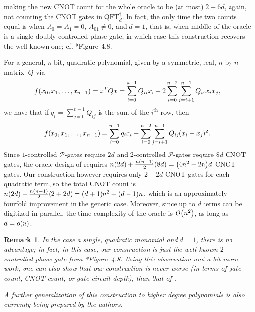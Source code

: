 \documentclass[reqno,10pt]{amsart}
\numberwithin{equation}{section}                %
\let\originalleft\left
\let\originalright\right
\renewcommand{\left}{\mathopen{}\mathclose\bgroup\originalleft}
\renewcommand{\right}{\aftergroup\egroup\originalright}
\def\({\mathopen{}\left(}
\def\){\right)\mathclose{}}
\newtheorem{remark}[theorem]{Remark}
\def\cP{\mathcal{P}}
\def\QFT{\mathrm{QFT}}
\begin{document}
making the new CNOT count for the whole oracle to be (at most) $2 + 6d$, again, not counting the CNOT gates in $\QFT_d^\dagger$. In fact, the only time the two counts equal is when $A_0 = A_1 = 0$, $A_{01} \neq 0$, and $d = 1$, that is, when middle of the oracle is a single doubly-controlled phase gate, in which case this construction recovers the well-known one; cf. \cite{nielsen_quantum_2010}*{Figure~4.8}.

\smallskip

For a general, $n$-bit, quadratic polynomial, given by a symmetric, real, $n$-by-$n$ matrix, $Q$ via
\begin{equation}
   f \( x_0, x_1, \ldots, x_{n - 1} \) = x^T Q x = \sum\limits_{i = 0}^{n - 1} Q_{ii} x_i + 2 \sum\limits_{i = 0}^{n - 2} \sum\limits_{j = i + 1}^{n - 1} Q_{ij} x_i x_j,
\end{equation}
we have that if $q_i = \sum\limits_{j = 0}^{n - 1} Q_{ij}$ is the sum of the $i^{\mathrm{th}}$ row, then
\begin{align}
   f \( x_0, x_1, \ldots, x_{n - 1} \) = \sum\limits_{i = 0}^{n - 1} q_i x_i - \sum\limits_{i = 0}^{n - 2} \sum\limits_{j = i + 1}^{n - 1} Q_{ij} \( x_i - x_j \)^2.
\end{align}
Since $1$-controlled $\cP$-gates require $2d$ and $2$-controlled $\cP$-gates require $8d$ CNOT gates, the oracle design of \cite{gilliam_grover_2021} requires $n \( 2 d \) + \tfrac{n \( n - 1 \)}{2} \( 8 d \) = \( 4 n^2 - 2 n \) d$ CNOT gates. Our construction however requires only $2 + 2d$ CNOT gates for each quadratic term, so the total CNOT count is $n \( 2 d \) + \tfrac{n \( n - 1 \)}{2} \( 2 + 2 d \) = \( d + 1 \) n^2 + \( d - 1\) n$, which is an approximately fourfold improvement in the generic case. Moreover, since up to $d$ terms can be digitized in parallel, the time complexity of the oracle is $O \( n^2 \)$, as long as $d = o \( n \)$.

\begin{remark}
   In the case a single, quadratic monomial and $d = 1$, there is no advantage; in fact, in this case, our construction is just the well-known $2$-controlled phase gate from \cite{nielsen_quantum_2010}*{Figure~4.8}. Using this observation and a bit more work, one can also show that our construction is never worse (in terms of gate count, CNOT count, or gate circuit depth), than that of \cite{gilliam_grover_2021}.

   A further generalization of this construction to higher degree polynomials is also currently being prepared by the authors.
\end{remark}
\end{document}

